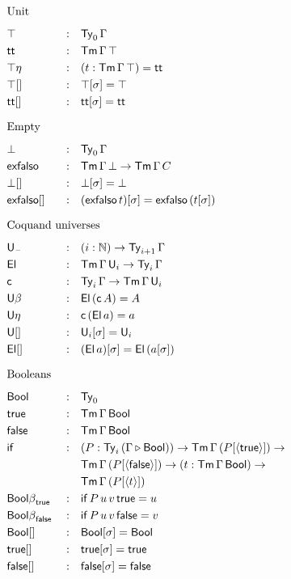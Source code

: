 \documentclass{article}
\begin{document}
\begin{multicols}{3}
\begin{alignat*}{5}
  & \heading{Unit} \\
  & \top && : && \Ty_0\,\Gamma \\
  & \tt && : && \Tm\,\Gamma\,\top \\
  & {\top\eta} && : && (t:\Tm\,\Gamma\,\top) = \tt \\
  & {\top[]} && : && \top[\sigma] = \top \\
  & {\tt[]} && : && \tt[\sigma] = \tt \\
  & \heading{Empty} \\
  & \bot && : && \Ty_0\,\Gamma \\
  & \exfalso && : && \Tm\,\Gamma\,\bot\ra\Tm\,\Gamma\,C \\
  & {\bot[]} && : && \bot[\sigma] = \bot \\
  & {\exfalso[]} && : && (\exfalso\,t)[\sigma] = \exfalso\,(t[\sigma]) \\
  & \heading{Coquand universes} \\
  & \U_{\blank} && : && (i:\N)\ra\Ty_{i+1}\,\Gamma \\
  & \El && : && \Tm\,\Gamma\,\U_i \ra \Ty_i\,\Gamma \\
  & \c && : && \Ty_i\,\Gamma\ra\Tm\,\Gamma\,\U_i \\
  & {\U\beta} && : && \El\,(\c\,A) = A \\
  & {\U\eta} && : && \c\,(\El\,a) = a \\
  & {\U[]} && : && \U_i[\sigma] = \U_i \\
  & {\El[]} && : && (\El\,a)[\sigma] = \El\,(a[\sigma]) \\
  & \heading{Booleans} \\
  & \Bool && : && \Ty_0 \\
  & \true && : && \Tm\,\Gamma\,\Bool \\
  & \false && : && \Tm\,\Gamma\,\Bool \\
  & \IF && : && (P:\Ty_i\,(\Gamma\ext\Bool))\ra\Tm\,\Gamma\,(P[\lb\true\rb])\ra \\
  & && && \Tm\,\Gamma\,(P[\lb\false\rb])\ra(t:\Tm\,\Gamma\,\Bool)\ra \\
  & && && \Tm\,\Gamma\,(P[\lb t\rb]) \\
  & {\Bool\beta}_\true && : && \IF\,P\,u\,v\,\true = u \\
  & {\Bool\beta}_\false && : && \IF\,P\,u\,v\,\false = v \\
  & {\Bool[]} && : && \Bool[\sigma] = \Bool \\
  & {\true[]} && : && \true[\sigma] = \true \\
  & {\false[]} && : && \false[\sigma] = \false \\

\end{alignat*}
\end{multicols}
\end{document}
